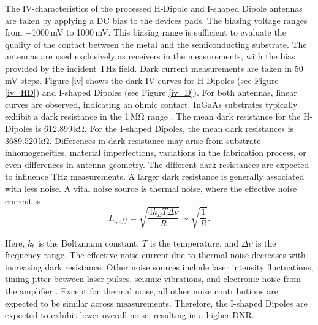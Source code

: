 The IV-characteristics of the processed H-Dipole and I-shaped Dipole antennas are taken by applying a DC bias to the devices pads. The biasing voltage ranges from \num{-1000}\,\si{\milli \volt} to \num{1000}\,\si{\milli \volt}. This biasing range is sufficient to evaluate the quality of the contact between the metal and the semiconducting substrate. The antennas are used exclusively as receivers in the measurements, with the bias provided by the incident THz field. Dark current measurements are taken in \num{50}\,\si{\milli \volt} steps. Figure \ref{iv} shows the dark IV curves for H-Dipoles (see Figure \ref{iv_HD}) and I-shaped Dipoles (see Figure \ref{iv_D}). For both antennas, linear curves are observed, indicating an ohmic contact. InGaAs substrates typically exhibit a dark resistance in the \num{1}\,\si{\mega \ohm} range \cite{seddonContinuousWaveTerahertz2024}. The mean dark resistance for the H-Dipoles is \num{612.899}\,\si{\kilo \ohm}. For the I-shaped Dipoles, the mean dark resistances is \num{3689.520}\,\si{\kilo \ohm}. Differences in dark resistance may arise from substrate inhomogeneities, material imperfections, variations in the fabrication process, or even differences in antenna geometry. The different dark resistances are expected to influence THz measurements. A larger dark resistance is generally associated with less noise. A vital noise source is thermal noise, where the effective noise current is 
\begin{equation}
    I_{n, eff} = \sqrt{\frac{4k_B T \Delta \nu}{R}} \sim \sqrt{\frac{1}{R}}.
\end{equation}

Here, $k_b$ is the Boltzmann constant, $T$ is the temperature, and $\Delta \nu$ is the frequency range. The effective noise current due to thermal noise decreases with increasing dark resistance. Other noise sources include laser intensity fluctuations, timing jitter between laser pulses, seismic vibrations, and electronic noise from the amplifier \cite{dongNoiseCharacteristicsTerahertz2015,vanexterCharacterizationOptoelectronicTerahertz1990}. Except for thermal noise, all other noise contributions are expected to be similar across measurements. Therefore, the I-shaped Dipoles are expected to exhibit lower overall noise, resulting in a higher DNR.

